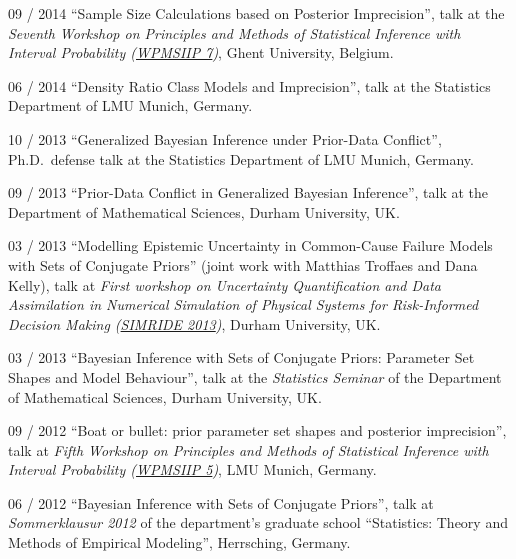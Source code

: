 \documentclass[a4paper]{simplecv}
\begin{document}
\begin{topic}
\item[09 / 2014] ``Sample Size Calculations based on Posterior Imprecision'', talk at the
                 \emph{Seventh Workshop on Principles and Methods of Statistical Inference with Interval Probability (\href{http://users.ugent.be/~slopatat/wpmsiip2014/index.html}{WPMSIIP 7})},
                 Ghent University, Belgium.

\item[06 / 2014] ``Density Ratio Class Models and Imprecision'',
                 talk at the Statistics Department of LMU Munich, Germany.

\item[10 / 2013] ``Generalized Bayesian Inference under Prior-Data Conflict'', Ph.D.\ defense talk at
                 the Statistics Department of LMU Munich, Germany.

\item[09 / 2013] ``Prior-Data Conflict in Generalized Bayesian Inference'', talk at
                 the Department of Mathematical Sciences, Durham University, UK.

\item[03 / 2013] ``Modelling Epistemic Uncertainty in Common-Cause Failure Models with Sets of Conjugate Priors''
                 (joint work with Matthias Troffaes and Dana Kelly), talk at
                 \emph{First workshop on Uncertainty Quantification and Data Assimilation in Numerical Simulation of Physical Systems
                 for Risk-Informed Decision Making (\href{http://www.maths.dur.ac.uk/users/matthias.troffaes/simride2013/}{SIMRIDE 2013})}, Durham University, UK.

\item[03 / 2013] ``Bayesian Inference with Sets of Conjugate Priors: Parameter Set Shapes and Model Behaviour'', talk at the
                 \emph{Statistics Seminar} of the Department of Mathematical Sciences, Durham University, UK.

\item[09 / 2012] ``Boat or bullet: prior parameter set shapes and posterior imprecision'', talk at
                 \emph{Fifth Workshop on Principles and Methods of Statistical Inference with Interval Probability (\href{http://statsoz-neu.userweb.mwn.de/research/WPMSIIP_2012/}{WPMSIIP 5})},
                 LMU Munich, Germany.

\item[06 / 2012] ``Bayesian Inference with Sets of Conjugate Priors'', talk at \emph{Sommerklausur 2012} of the department's graduate school
                 ``Statistics: Theory and Methods of Empirical Modeling'', Herrsching, Germany.


\end{topic}
\end{document}
